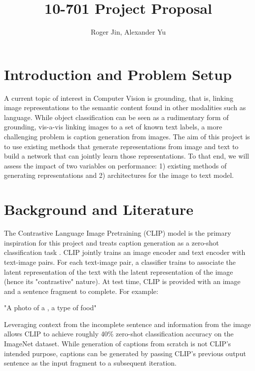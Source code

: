 \documentclass{article}
\title{10-701 Project Proposal}
\author{Roger Jin, Alexander Yu}
\date{}
\begin{document}
\maketitle

\section{Introduction and Problem Setup}
A current topic of interest in Computer Vision is grounding, that is, linking image representations to the semantic content found in other modalities such as language. While object classification can be seen as a rudimentary form of grounding, vis-a-vis linking images to a set of known text labels, a more challenging problem is caption generation from images. The aim of this project is to use existing methods that generate representations from image and text to build a network that can jointly learn those representations. To that end, we will assess the impact of two variables on performance: 1) existing methods of generating representations and 2) architectures for the image to text model.
 
\section{Background and Literature}
The Contrastive Language Image Pretraining (CLIP) model is the primary inspiration for this project and treats caption generation as a zero-shot classification task \cite{radford2021learning}. CLIP jointly trains an image encoder and text encoder with text-image pairs. For each text-image pair, a classifier trains to associate the latent representation of the text with the latent representation of the image (hence its "contrastive" nature). At test time, CLIP is provided with an image and a sentence fragment to complete. For example:
\begin{center}
    "A photo of a \underline{\hspace{0.75in}}, a type of food"
\end{center}
Leveraging context from the incomplete sentence and information from the image allows CLIP to achieve roughly 40\% zero-shot classification accuracy on the ImageNet dataset. While generation of captions from scratch is not CLIP's intended purpose, captions can be generated by passing CLIP's previous output sentence as the input fragment to a subsequent iteration. 
\end{document}
